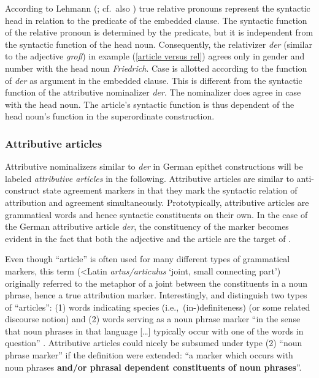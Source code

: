 According to Lehmann (\citeyear[230–231]{lehmann1984}; cf.~also \citealt[181]{himmelmann1997}) true relative pronouns represent the syntactic head in relation to the predicate of the embedded clause. The syntactic function of the relative pronoun is determined by the predicate, but it is independent from the syntactic function of the head noun. Consequently, the relativizer \textit{der} (similar to the adjective \textit{groß}) in example (\ref{article versus rel}) agrees only in gender and number with the head noun \textit{Friedrich}. Case is allotted according to the function of \textit{der} as argument in the embedded clause. This is different from the syntactic function of the attributive nominalizer \textit{der}. The nominalizer does agree in case with the head noun. The article's syntactic function is thus dependent of the head noun's function in the superordinate construction.

\subsubsection{Attributive articles} \label{attr art}
Attributive nominalizers similar to \textit{der} in German epithet constructions will be labeled \emph{attributive articles} in the following. Attributive articles are similar to anti\hyp{}construct state agreement markers in that they mark the syntactic relation of attribution and agreement simultaneously. Prototypically, attributive articles are grammatical words and hence syntactic constituents on their own. In the case of the German attributive article \textit{der}, the constituency of the marker becomes evident in the fact that both the adjective and the article are the target of .

Even though “article” is often used for many different types of grammatical markers, this term (<Latin \emph{artus\slash{}articulus} ‘joint, small connecting part’) originally referred to the metaphor of a joint between the constituents in a noun phrase, hence a true attribution marker. Interestingly, \citet[83]{dryer1989a} and \citet{rijkhoff2002} distinguish two types of “articles”: (1) words indicating species (i.e.,~(in-)definiteness) (or some related discourse notion) and (2) words serving as a noun phrase marker “in the sense that noun phrases in that language [\dots] typically occur with one of the words in question” \citep[285]{rijkhoff2002}. Attributive articles could nicely be subsumed under type (2) “noun phrase marker” if the definition were extended: “a marker which occurs with noun phrases \textbf{and\slash{}or phrasal dependent constituents of noun phrases}”.

